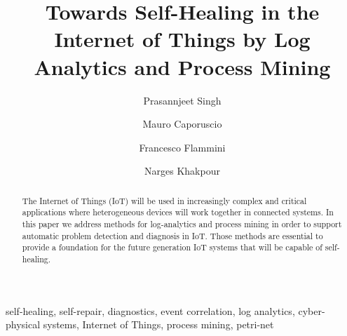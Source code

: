 \documentclass[a4paper,10pt,3p,twocolumn]{elsarticle}
\begin{document}
	
	
	
	\begin{frontmatter}
		
		\title{Towards Self-Healing in the Internet of Things by Log Analytics and Process Mining}
		
		\author[1]{Prasannjeet Singh}
		\author[1]{Mauro Caporuscio}
		\author[1]{Francesco Flammini}
		\author[1]{Narges Khakpour}
		
		\address[1]{Linnaeus University, Sweden}
		
		\begin{abstract}
			The Internet of Things (IoT) will be used in increasingly complex and critical applications where heterogeneous devices will work together in connected systems. In this paper we address methods for log-analytics and process mining in order to support automatic problem detection and diagnosis in IoT. Those methods are essential to provide a foundation for the future generation IoT systems that will be capable of self-healing.
		\end{abstract}
		
		\begin{keyword}
			self-healing, self-repair, diagnostics, event correlation, log analytics, cyber-physical systems, Internet of Things, process mining, petri-net
		\end{keyword}
		
	\end{frontmatter}
	
	
	
	
	
	\setmainfont[
	BoldFont={Charter Bold}, 
	ItalicFont={Charter Italic},
	]{Charter}
	
\end{document}

